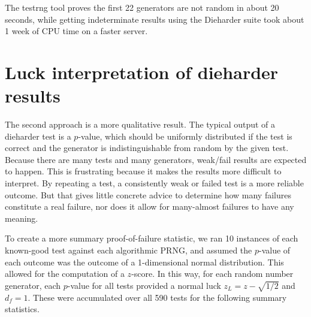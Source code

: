 The testrng tool proves the first 22 generators are not random in about 20 seconds, while getting indeterminate results using the Dieharder suite took about 1 week of CPU time on a faster server.

\section{Luck interpretation of dieharder results}
The second approach is a more qualitative result.  The typical output of a dieharder test is a $p$-value, which should be uniformly distributed if the test is correct and the generator is indistinguishable from random by the given test.  Because there are many tests and many generators, weak/fail results are expected to happen.  This is frustrating because it makes the results more difficult to interpret.  By repeating a test, a consistently weak or failed test is a more reliable outcome.  But that gives little concrete advice to determine how many failures constitute a real failure, nor does it allow for many-almost failures to have any meaning.

To create a more summary proof-of-failure statistic, we ran 10 instances of each known-good test against each algorithmic PRNG, and assumed the $p$-value of each outcome was the outcome of a 1-dimensional normal distribution.  This  allowed for the computation of a $z$-score.  In this way, for each random number generator, each $p$-value for all tests provided a normal luck $z_L=z-\sqrt{1/2}$ and $d_f=1$. These were accumulated over all 590 tests for the following summary statistics.

